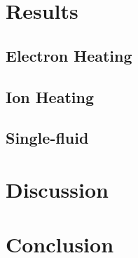 \documentclass[iop]{emulateapj}
\begin{document}
	\section{Results}
	\subsection{Electron Heating}
	\subsection{Ion Heating}
	\subsection{Single-fluid}
	\section{Discussion}
	\section{Conclusion}
	
	
	
\end{document}
